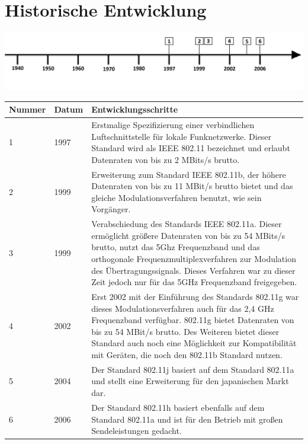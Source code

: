 \section*{Historische Entwicklung}
\includegraphics[width=\textwidth]{Kapitel/IEEE802.11/Grafiken/Zeitstrahl_2}
\par
\noindent
\begin{tabular}{|p{1 cm}|p{3 cm}|p{13.55 cm}|}
	\hline
	Nummer & Datum & Entwicklungsschritte~\cite{basics.1}\\
	\hline
	1 & 1997 &  Erstmalige Spezifizierung einer verbindlichen Luftschnittstelle für lokale Funknetzwerke. Dieser Standard wird als IEEE 802.11 bezeichnet und erlaubt Datenraten von bis zu 2 MBits/s brutto.\\
	\hline
	2 & 1999 & Erweiterung zum Standard IEEE 802.11b, der höhere Datenraten von bis zu 11 MBit/s brutto bietet und das gleiche Modulationsverfahren benutzt, wie sein Vorgänger.\\
	\hline
	3 & 1999 & Verabschiedung des Standards IEEE 802.11a. Dieser ermöglicht größere Datenraten von bis zu 54 MBits/s brutto, nutzt das 5Ghz Frequenzband und das orthogonale Frequenzmultiplexverfahren zur Modulation des Übertragungssignals. Dieses Verfahren war zu dieser Zeit jedoch  nur für das 5GHz Frequenzband freigegeben.\\
	\hline
	4 & 2002 & Erst 2002 mit der Einführung des Standards 802.11g war dieses Modulationsverfahren auch für das 2,4 GHz Frequenzband verfügbar. 802.11g bietet Datenraten von bis zu 54 MBit/s brutto. Des Weiteren bietet dieser Standard auch noch eine Möglichkeit zur Kompatibilität mit Geräten, die noch den 802.11b Standard nutzen.\\
	\hline
	5 & 2004 & Der Standard 802.11j basiert auf dem Standard 802.11a und stellt eine Erweiterung für den japanischen Markt dar.\\
	\hline
	6 & 2006 & Der Standard 802.11h basiert ebenfalls auf dem Standard 802.11a und ist für den Betrieb mit großen Sendeleistungen gedacht.\\
	\hline
\end{tabular}
\par
